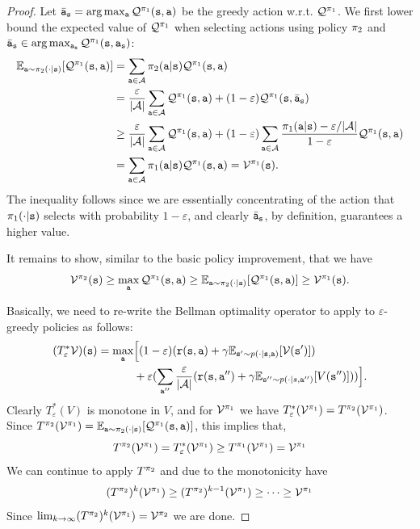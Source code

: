 \begin{proof}
Let $\bar{{\tt a}}_{\tt s}=\arg\max_{\tt a}
\mathcal{Q}^{\pi_1}({\tt s},{\tt a})$ be the greedy action w.r.t.
$\mathcal{Q}^{\pi_1}$. We first lower bound the expected value of $\mathcal{Q}^{\pi_1}$ when selecting actions using policy $\pi_2$ and $\bar{{\tt a}}_{\tt s}\in\arg\max_{{\tt a}_{\tt s}} \mathcal{Q}^{\pi_1}({\tt s},{\tt a}_{\tt s}) $:
\begin{align*}
\mathbb{E}_{{\tt a}\sim\pi_2(\cdot|{\tt s})}[\mathcal{Q}^{\pi_1}({\tt s},{\tt a})] &= \sum_{{\tt a} \in \mathcal{A}} \pi_2({\tt a}|{\tt s}) \mathcal{Q}^{\pi_1}({\tt s},{\tt a})\\
&= \frac{\varepsilon}{|\mathcal{A}|}\sum_{{\tt a} \in \mathcal{A}}
\mathcal{Q}^{\pi_1}({\tt s},{\tt a})+(1-\varepsilon)\mathcal{Q}^{\pi_1}({\tt s},\bar{{\tt a}}_{\tt s})\\
&\geq \frac{\varepsilon}{|\mathcal{A}|}\sum_{{\tt a} \in \mathcal{A}}
\mathcal{Q}^{\pi_1}({\tt s},{\tt a})+(1-\varepsilon)\sum_{{\tt a} \in
\mathcal{A}}
\frac{\pi_1({\tt a}|{\tt s})-\varepsilon/|\mathcal{A}|}{1-\varepsilon}\mathcal{Q}^{\pi_1}({\tt s},{\tt a})\\
&=\sum_{{\tt a} \in \mathcal{A}} \pi_1({\tt a}|{\tt s})\mathcal{Q}^{\pi_1}({\tt s},{\tt a})=\mathcal{V}^{\pi_1}({\tt s}).
\end{align*}
The inequality follows since we are essentially concentrating of
the action that $\pi_1(\cdot|{\tt s})$ selects with probability
$1-\varepsilon$, and clearly $\bar{{\tt a}}_{\tt s}$, by definition,
guarantees a higher value.

It remains to show, similar to the basic policy improvement, that we have
$$
\mathcal{V}^{\pi_2} ({\tt s})\geq
\max_{\tt a} \mathcal{Q}^{\pi_1}({\tt s},{\tt a})\geq
\mathbb{E}_{{\tt a}\sim\pi_2(\cdot|{\tt s})}[\mathcal{Q}^{\pi_1}({\tt s},{\tt a})]
\geq \mathcal{V}^{\pi_1}({\tt s}).
$$

Basically, we need to re-write the Bellman optimality operator to
apply to $\varepsilon$-greedy policies as follows:
\begin{align*}
(T^*_\varepsilon \mathcal{V})({\tt s}) = \max_{\tt a}
& \Big[(1-\varepsilon)({\tt r}({\tt s},{\tt a})+\gamma \mathbb{E}_{{\tt s}'\sim
p(\cdot |{\tt s},{\tt a})}[\mathcal{V}({\tt s}')])\\
&+ \varepsilon
(\sum_{{\tt a}''}\frac{\varepsilon}{|\mathcal{A}|}({\tt r}({\tt s},{\tt a}'')
+\gamma \mathbb{E}_{{\tt s}''\sim p(\cdot |s,{\tt a}'')}[V({\tt s}'')]))\Big].
\end{align*}
Clearly $T^*_\varepsilon(V)$ is monotone in $V$, and for
$\mathcal{V}^{\pi_1}$ we have
$T^*_\varepsilon(\mathcal{V}^{\pi_1})=T^{\pi_2}(\mathcal{V}^{\pi_1})$.
Since $ T^{\pi_2}(\mathcal{V}^{\pi_1}) =
\mathbb{E}_{{\tt a}\sim\pi_2(\cdot|{\tt s})}[\mathcal{Q}^{\pi_1}({\tt s},{\tt a})]$,
this implies that,
\[
T^{\pi_2}(\mathcal{V}^{\pi_1})=T^*_\varepsilon(\mathcal{V}^{\pi_1})
\geq T^{\pi_1}(\mathcal{V}^{\pi_1}) = \mathcal{V}^{\pi_1}
\]
We can continue to apply $T^{\pi_2}$ and due to the monotonicity
have
\[
(T^{\pi_2})^k (\mathcal{V}^{\pi_1}) \geq (T^{\pi_2})^{k-1}
(\mathcal{V}^{\pi_1}) \geq \cdots \geq \mathcal{V}^{\pi_1}
\]
Since $\lim_{k\rightarrow \infty}(T^{\pi_2})^k
(\mathcal{V}^{\pi_1}) = \mathcal{V}^{\pi_2}$ we are done.
\end{proof}


